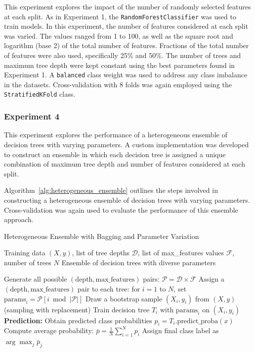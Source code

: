 \documentclass[conference]{IEEEtran}
\begin{document}
This experiment explores the impact of the number of randomly selected features at each split. As in Experiment 1, the \texttt{RandomForestClassifier} was used to train models. In this experiment, the number of features considered at each split was varied. The values ranged from 1 to 100, as well as the square root and logarithm (base 2) of the total number of features. Fractions of the total number of features were also used, specifically 25\% and 50\%. The number of trees and maximum tree depth were kept constant using the best parameters found in Experiment 1. A \texttt{balanced} class weight was used to address any class imbalance in the datasets. Cross-validation with 8 folds was again employed using the \texttt{StratifiedKFold} class.

\subsubsection{Experiment 4}

This experiment explores the performance of a heterogeneous ensemble of decision trees with varying parameters. A custom implementation was developed to construct an ensemble in which each decision tree is assigned a unique combination of maximum tree depth and number of features considered at each split.

Algorithm~\ref{alg:heterogeneous_ensemble} outlines the steps involved in constructing a heterogeneous ensemble of decision trees with varying parameters. Cross-validation was again used to evaluate the performance of this ensemble approach.

\begin{algorithm}[H]
\caption{Heterogeneous Ensemble with Bagging and Parameter Variation}
\label{alg:heterogeneous_ensemble}
\begin{algorithmic}[1]
\REQUIRE Training data $(X, y)$, list of tree depths $\mathcal{D}$, list of max\_features values $\mathcal{F}$, number of trees $N$
\ENSURE Ensemble of decision trees with diverse parameters

\STATE Generate all possible $(\text{depth}, \text{max\_features})$ pairs: $\mathcal{P} = \mathcal{D} \times \mathcal{F}$
\STATE Assign a $(\text{depth}, \text{max\_features})$ pair to each tree: for $i = 1$ to $N$, set $\text{params}_i = \mathcal{P}[i \bmod |\mathcal{P}|]$
    \STATE Draw a bootstrap sample $(X_i, y_i)$ from $(X, y)$ (sampling with replacement)
    \STATE Train decision tree $T_i$ with $\text{params}_i$ on $(X_i, y_i)$
\ENDFOR
\STATE \textbf{Prediction:}
        \STATE Obtain predicted class probabilities $p_i = T_i.\text{predict\_proba}(x)$
    \ENDFOR
    \STATE Compute average probability: $\bar{p} = \frac{1}{N} \sum_{i=1}^N p_i$
    \STATE Assign final class label as $\arg\max_j \bar{p}_j$
\ENDFOR
\end{algorithmic}
\end{algorithm}
\end{document}
